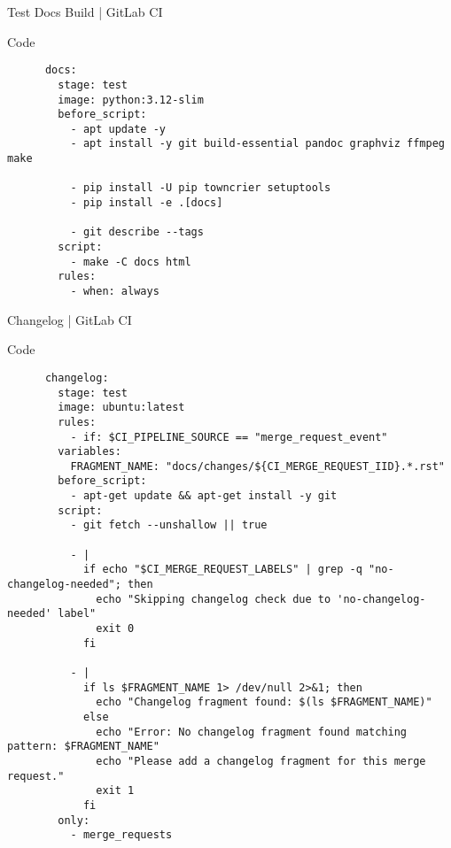 \begin{frame}[fragile]{Test Docs Build | GitLab CI}
  \begin{block}{Code}
    \footnotesize
    \begin{verbatim}
      docs:
        stage: test
        image: python:3.12-slim
        before_script:
          - apt update -y
          - apt install -y git build-essential pandoc graphviz ffmpeg make

          - pip install -U pip towncrier setuptools
          - pip install -e .[docs]

          - git describe --tags
        script:
          - make -C docs html
        rules:
          - when: always
      \end{verbatim}
   \end{block}
\end{frame}


\begin{frame}[fragile]{Changelog | GitLab CI}
  \begin{block}{Code}
    \scriptsize
    \begin{verbatim}
      changelog:
        stage: test
        image: ubuntu:latest
        rules:
          - if: $CI_PIPELINE_SOURCE == "merge_request_event"
        variables:
          FRAGMENT_NAME: "docs/changes/${CI_MERGE_REQUEST_IID}.*.rst"
        before_script:
          - apt-get update && apt-get install -y git
        script:
          - git fetch --unshallow || true
          
          - |
            if echo "$CI_MERGE_REQUEST_LABELS" | grep -q "no-changelog-needed"; then
              echo "Skipping changelog check due to 'no-changelog-needed' label"
              exit 0
            fi
          
          - |
            if ls $FRAGMENT_NAME 1> /dev/null 2>&1; then
              echo "Changelog fragment found: $(ls $FRAGMENT_NAME)"
            else
              echo "Error: No changelog fragment found matching pattern: $FRAGMENT_NAME"
              echo "Please add a changelog fragment for this merge request."
              exit 1
            fi
        only:
          - merge_requests
     \end{verbatim}
   \end{block}
\end{frame}



